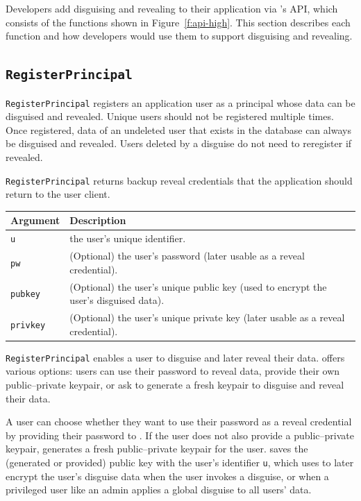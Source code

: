 Developers add disguising and revealing to their application via \sys's API,
which consists of the functions shown in Figure~\ref{f:api-high}. This section
describes each function and how developers would use them to support disguising
and revealing.

\subsection{\texttt{RegisterPrincipal}}
    \texttt{RegisterPrincipal} registers an application user as a principal
    whose data can be disguised and revealed. Unique users should not be
    registered multiple times. Once registered, data of an undeleted user that
    exists in the database can always be disguised and revealed.  Users deleted
    by a disguise do not need to reregister if revealed.

    \texttt{RegisterPrincipal} returns backup reveal credentials that the
    application should return to the user client.

    \begin{center}
    \begin{longtable}{|m{}|m{}|}
        \hline
        \textbf{Argument} & \textbf{Description} \\
        \hline
        \texttt{u} & the user's unique identifier.\\
        \hline
        \texttt{pw} & (Optional) the user's password (later usable as a reveal credential).\\
        \hline
        \texttt{pubkey} & (Optional) the user's unique public key (used to encrypt the
        user's disguised data).\\
        \hline
        \texttt{privkey} & (Optional) the user's unique private key (later usable as a reveal
        credential).\\
        \hline
    \end{longtable}
    \end{center}
    \vspace{-24pt}

    \texttt{RegisterPrincipal} enables a user to disguise and later reveal their
    data. \sys offers various options: users can use their password
    to reveal data, provide their own public--private keypair, or ask \sys to
    generate a fresh keypair to disguise and reveal their data.

    A user can choose whether they want to use their password as a reveal
    credential by providing their password to \sys. If the user does not also
    provide a public--private keypair, \sys generates a fresh public--private
    keypair for the user. \sys saves the (generated or provided) public key
    with the user's identifier \texttt{u}, which \sys uses to later encrypt the
    user's disguise data when the user invokes a disguise, or when a privileged
    user like an admin applies a global disguise to all users' data.

